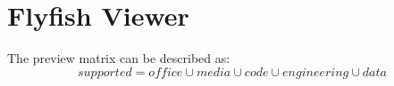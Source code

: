 \documentclass{article}
\begin{document}
\section{Flyfish Viewer}
The preview matrix can be described as:
\[
  supported = office \cup media \cup code \cup engineering \cup data
\]
\end{document}
